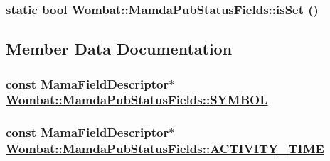 \hypertarget{classWombat_1_1MamdaPubStatusFields_92488c941eeb098cc3af01e116a4c3d4}{
\subsubsection[isSet]{\setlength{\rightskip}{0pt plus 5cm}static bool Wombat::Mamda\-Pub\-Status\-Fields::is\-Set ()}}
\label{classWombat_1_1MamdaPubStatusFields_92488c941eeb098cc3af01e116a4c3d4}




\subsection{Member Data Documentation}
\hypertarget{classWombat_1_1MamdaPubStatusFields_88e65570ddcee65400e471ed698b2e2b}{
\subsubsection[SYMBOL]{\setlength{\rightskip}{0pt plus 5cm}const Mama\-Field\-Descriptor$\ast$ \hyperlink{classWombat_1_1MamdaPubStatusFields_88e65570ddcee65400e471ed698b2e2b}{Wombat::Mamda\-Pub\-Status\-Fields::SYMBOL}}}
\label{classWombat_1_1MamdaPubStatusFields_88e65570ddcee65400e471ed698b2e2b}


\hypertarget{classWombat_1_1MamdaPubStatusFields_523e4b2b57b4e6114514691addb1cd44}{
\subsubsection[ACTIVITY\_\-TIME]{\setlength{\rightskip}{0pt plus 5cm}const Mama\-Field\-Descriptor$\ast$ \hyperlink{classWombat_1_1MamdaPubStatusFields_523e4b2b57b4e6114514691addb1cd44}{Wombat::Mamda\-Pub\-Status\-Fields::ACTIVITY\_\-TIME}}}
\label{classWombat_1_1MamdaPubStatusFields_523e4b2b57b4e6114514691addb1cd44}


